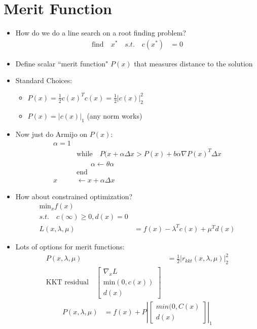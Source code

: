 \documentclass[11pt]{article}
\begin{document}
\section{Merit Function}
\begin{itemize}
    \item How do we do a line search on a root finding problem?
    \begin{align*}
        \text{find} \quad x^* \quad s.t. \quad c(x^*) &= 0
    \end{align*}
    \item Define scalar ``merit function" $P(x)$ that measures distance to the solution
    \item Standard Choices:
    \begin{itemize}
        \item $P(x) = \frac{1}{2}c(x)^Tc(x) = \frac{1}{2}|c(x)|^2_2$
        \item $P(x) = |c(x)|_1$ (any norm works)
    \end{itemize}
    \item Now just do Armijo on $P(x)$:
    \begin{align*}
        \alpha = 1&
        \\
        &\text{while} \quad P(x+\alpha\Delta x > P(x) + b\alpha\nabla P(x)^T\Delta x
        \\
        &\quad\quad\alpha \leftarrow \theta\alpha
        \\
        &\text{end}
        \\
        x &\leftarrow x + \alpha \Delta x
    \end{align*}
    \item How about constrained optimization?
    \begin{align*}
        \text{min}_x f(x)
        \\
        s.t. \quad c(\infty) \geq 0,d (x) = 0
        \\
        L(x,\lambda,\mu) &= f(x) - \lambda^T c(x) + \mu^Td(x)
    \end{align*}
    \item Lots of options for merit functions:
    \begin{align*}
        P(x,\lambda,\mu) &= \frac{1}{2}|r_{kkt}(x,\lambda,\mu)|^2_2
        \\
        \text{KKT residual} \quad \begin{bmatrix}
            \nabla_x L \\
            \text{min}(0,c(x))
            \\
            d(x)
        \end{bmatrix}
    \end{align*}
    \begin{align*}
        P(x,\lambda,\mu) &= f(x) + P\left| \begin{bmatrix}
            min(0,C(x) \\
            d(x)
        \end{bmatrix}\right|_1
    \end{align*}
\end{itemize}
\end{document}
